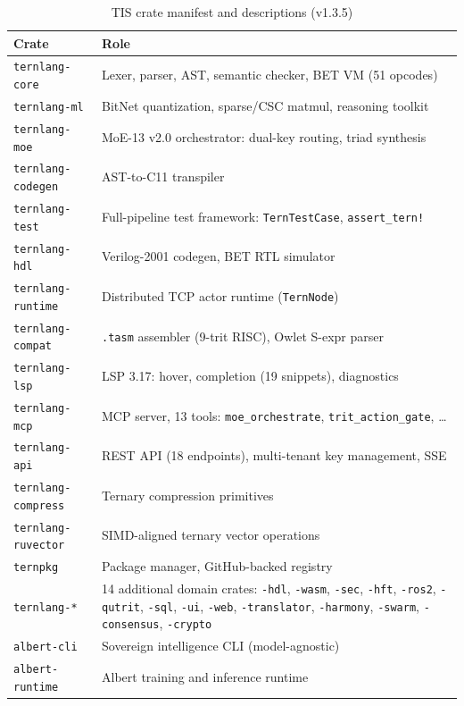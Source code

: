 \documentclass[journal,10pt,twocolumn]{IEEEtran}
\begin{document}
\begin{table}[h]
\centering
\small
\caption{TIS crate manifest and descriptions (v1.3.5)}
\label{tab:status}
\begin{tabular}{p{2.6cm}p{5.0cm}}
\toprule
Crate & Role \\
\midrule
\texttt{ternlang-core}      & Lexer, parser, AST, semantic checker, BET VM (51 opcodes) \\
\texttt{ternlang-ml}        & BitNet quantization, sparse/CSC matmul, reasoning toolkit \\
\texttt{ternlang-moe}       & MoE-13 v2.0 orchestrator: dual-key routing, triad synthesis \\
\texttt{ternlang-codegen}   & AST-to-C11 transpiler \\
\texttt{ternlang-test}      & Full-pipeline test framework: \texttt{TernTestCase}, \texttt{assert\_tern!} \\
\texttt{ternlang-hdl}       & Verilog-2001 codegen, BET RTL simulator \\
\texttt{ternlang-runtime}   & Distributed TCP actor runtime (\texttt{TernNode}) \\
\texttt{ternlang-compat}    & \texttt{.tasm} assembler (9-trit RISC), Owlet S-expr parser \\
\texttt{ternlang-lsp}       & LSP 3.17: hover, completion (19 snippets), diagnostics \\
\texttt{ternlang-mcp}       & MCP server, 13 tools: \texttt{moe\_orchestrate}, \texttt{trit\_action\_gate}, \ldots \\
\texttt{ternlang-api}       & REST API (18 endpoints), multi-tenant key management, SSE \\
\texttt{ternlang-compress}  & Ternary compression primitives \\
\texttt{ternlang-ruvector}  & SIMD-aligned ternary vector operations \\
\texttt{ternpkg}            & Package manager, GitHub-backed registry \\
\texttt{ternlang-*}         & 14 additional domain crates: \texttt{-hdl}, \texttt{-wasm}, \texttt{-sec}, \texttt{-hft}, \texttt{-ros2}, \texttt{-qutrit}, \texttt{-sql}, \texttt{-ui}, \texttt{-web}, \texttt{-translator}, \texttt{-harmony}, \texttt{-swarm}, \texttt{-consensus}, \texttt{-crypto} \\
\midrule
\texttt{albert-cli}         & Sovereign intelligence CLI (model-agnostic) \\
\texttt{albert-runtime}     & Albert training and inference runtime \\

\end{tabular}
\end{table}
\end{document}
